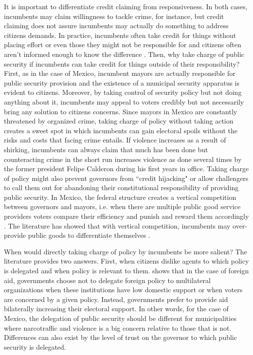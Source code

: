 \documentclass[12pt]{amsart}
\numberwithin{equation}{section}
\theoremstyle{definition}
\theoremstyle{definition}
\theoremstyle{definition}
\begin{document}
It is important to differentiate  credit claiming from responsiveness. In both cases, incumbents may claim willingness to tackle crime, for instance, but credit claiming does not assure incumbents may actually do something to address citizens demands. In practice, incumbents often take credit for things without placing effort or even those they might not be responsible for and citizens often aren't informed enough to know the difference \citep{benedictis_kessner_2020}. Then, why take charge of public security if incumbents can take credit for things outside of their responsibility? First, as in the case of Mexico, incumbent mayors are actually responsible for public security provision and the existence of a municipal security apparatus is evident to citizens. Moreover, by taking control of security policy but not doing anything about it, incumbents may appeal to voters credibly but not necessarily bring any solution to citizens concerns. Since mayors in Mexico are constantly threatened by organized crime, taking charge of policy without taking action creates a sweet spot in which incumbents can gain electoral spoils without the risks and costs that facing crime entails. If violence increases as a result of shirking, incumbents can always claim that much has been done but counteracting crime in the short run increases violence as done several times by the former president Felipe Calderon during his first years in office. Taking charge of policy might also prevent governors from ``credit hijacking" \citep{bueno_2017} or allow challengers to call them out for abandoning their constitutional responsibility of providing public security. In Mexico, the federal structure creates a vertical competition between governors and mayors, i.e. when there are multiple public good service providers voters compare their efficiency and punish and reward them accordingly \citep{treisman_2000, rodden_2010}. The literature has showed that with vertical competition, incumbents may over-provide public goods to differentiate themselves \citep{salmon_1987, Breton_1996, treisman_2000}. %
 
When would directly taking charge of policy by incumbents be more salient? The literature provides two answers. First, when citizens dislike agents to which policy is delegated and when policy is relevant to them. \citet{milner_2004} shows that in the case of foreign aid, governments choose not to delegate foreign policy to multilateral organizations when these institutions have low domestic support or when voters are concerned by a given policy. Instead, governments prefer to provide aid bilaterally increasing their electoral support. In other words, for the case of Mexico, the delegation of public security should be different for municipalities where narcotraffic and violence is a big concern relative to those that is not. Differences can also exist by the level of trust on the governor to which public security is delegated.
\end{document}
